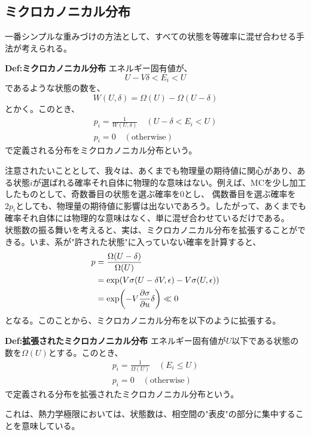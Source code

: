 \documentclass[a4paper,11pt]{jsarticle}
\numberwithin{equation}{section}
\begin{document}
\subsection{ミクロカノニカル分布}
一番シンプルな重みづけの方法として、すべての状態を等確率に混ぜ合わせる手法が考えられる。

\begin{itembox}[l]{\textbf{Def:ミクロカノニカル分布}}
  エネルギー固有値が、
  \begin{equation}
    U - V\delta < E_{i} < U
  \end{equation}
  であるような状態の数を、
  \begin{equation}
    W(U,\delta) = \Omega (U) - \Omega(U-\delta)
  \end{equation}
  とかく。このとき、
  \begin{align}
    p_i = \frac{1}{W(U,\delta)} \quad (U-\delta < E_i < U)\\
    p_i = 0 \quad (\text{otherwise})
  \end{align}
  で定義される分布をミクロカノニカル分布という。
\end{itembox}

注意されたいこととして、我々は、あくまでも物理量の期待値に関心があり、ある状態$i$が選ばれる確率それ自体に物理的な意味はない。例えば、MCを少し加工したものとして、奇数番目の状態を選ぶ確率を$0$とし、
偶数番目を選ぶ確率を$2p_i$としても、物理量の期待値に影響は出ないであろう。したがって、あくまでも確率それ自体には物理的な意味はなく、単に混ぜ合わせているだけである。\\

状態数の振る舞いを考えると、実は、ミクロカノニカル分布を拡張することができる。いま、系が"許された状態"に入っていない確率を計算すると、
\begin{align}
  p &= \frac{\Omega(U-\delta)}{\Omega(U)}\\
  &= \exp(V\sigma(U-\delta V,\epsilon)-V\sigma(U,\epsilon))\\
  &= \exp(-V\pdv{\sigma}{u}\delta )
  \ll 0 
\end{align}
となる。このことから、ミクロカノニカル分布を以下のように拡張する。
\begin{itembox}[l]{\textbf{Def:拡張されたミクロカノニカル分布}}
  エネルギー固有値が$U$以下である状態の数を$\Omega(U)$とする。このとき、
  \begin{align}
    p_i = \frac{1}{\Omega(U)} \quad (E_i \leq U)\\
    p_i = 0 \quad (\text{otherwise})
  \end{align}
  で定義される分布を拡張されたミクロカノニカル分布という。
\end{itembox}
これは、熱力学極限においては、状態数は、相空間の"表皮"の部分に集中することを意味している。\\
\end{document}
